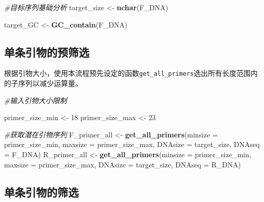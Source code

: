 \documentclass[
]{article}
\newenvironment{Shaded}{\begin{snugshade}}{\end{snugshade}}
\newcommand{\AttributeTok}[1]{\textcolor[rgb]{0.13,0.29,0.53}{#1}}
\newcommand{\CommentTok}[1]{\textcolor[rgb]{0.56,0.35,0.01}{\textit{#1}}}
\newcommand{\DecValTok}[1]{\textcolor[rgb]{0.00,0.00,0.81}{#1}}
\newcommand{\FunctionTok}[1]{\textcolor[rgb]{0.13,0.29,0.53}{\textbf{#1}}}
\newcommand{\NormalTok}[1]{#1}
\newcommand{\OtherTok}[1]{\textcolor[rgb]{0.56,0.35,0.01}{#1}}
\begin{document}
\begin{Shaded}
\begin{Highlighting}[]
\CommentTok{\#目标序列基础分析}
\NormalTok{target\_size }\OtherTok{\textless{}{-}} \FunctionTok{nchar}\NormalTok{(F\_DNA)}

\NormalTok{target\_GC }\OtherTok{\textless{}{-}} \FunctionTok{GC\_contain}\NormalTok{(F\_DNA)}
\end{Highlighting}
\end{Shaded}

\hypertarget{ux5355ux6761ux5f15ux7269ux7684ux9884ux7b5bux9009}{%
\subsection{单条引物的预筛选}\label{ux5355ux6761ux5f15ux7269ux7684ux9884ux7b5bux9009}}

根据引物大小，使用本流程预先设定的函数\texttt{get\_all\_primers}选出所有长度范围内的子序列以减少运算量。

\begin{Shaded}
\begin{Highlighting}[]
\CommentTok{\#输入引物大小限制}

\NormalTok{primer\_size\_min }\OtherTok{\textless{}{-}} \DecValTok{18}
\NormalTok{primer\_size\_max }\OtherTok{\textless{}{-}} \DecValTok{23}

\CommentTok{\#获取潜在引物序列}
\NormalTok{F\_primer\_all }\OtherTok{\textless{}{-}} \FunctionTok{get\_all\_primers}\NormalTok{(}\AttributeTok{minsize =}\NormalTok{ primer\_size\_min,}
                                \AttributeTok{maxsize =}\NormalTok{ primer\_size\_max,}
                                \AttributeTok{DNAsize =}\NormalTok{ target\_size,}
                                \AttributeTok{DNAseq =}\NormalTok{ F\_DNA)}
\NormalTok{R\_primer\_all }\OtherTok{\textless{}{-}} \FunctionTok{get\_all\_primers}\NormalTok{(}\AttributeTok{minsize =}\NormalTok{ primer\_size\_min,}
                                \AttributeTok{maxsize =}\NormalTok{ primer\_size\_max,}
                                \AttributeTok{DNAsize =}\NormalTok{ target\_size,}
                                \AttributeTok{DNAseq =}\NormalTok{ R\_DNA)}
\end{Highlighting}
\end{Shaded}

\hypertarget{ux5355ux6761ux5f15ux7269ux7684ux7b5bux9009}{%
\subsection{单条引物的筛选}\label{ux5355ux6761ux5f15ux7269ux7684ux7b5bux9009}}
\end{document}
